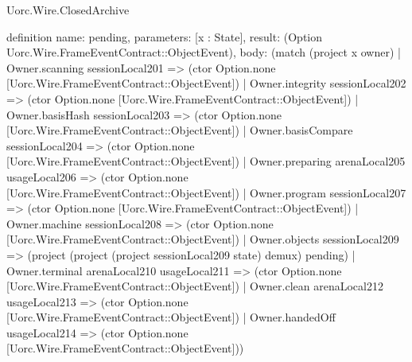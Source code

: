 \begin{lexlean}{Uorc.Wire.ClosedArchive}
\begin{semanticmodule}
definition{
  name: pending,
  parameters: [x : State],
  result: (Option Uorc.Wire.FrameEventContract::ObjectEvent),
  body: (match (project x owner)
    | Owner.scanning sessionLocal201 => (ctor Option.none [Uorc.Wire.FrameEventContract::ObjectEvent])
    | Owner.integrity sessionLocal202 => (ctor Option.none [Uorc.Wire.FrameEventContract::ObjectEvent])
    | Owner.basisHash sessionLocal203 => (ctor Option.none [Uorc.Wire.FrameEventContract::ObjectEvent])
    | Owner.basisCompare sessionLocal204 => (ctor Option.none [Uorc.Wire.FrameEventContract::ObjectEvent])
    | Owner.preparing arenaLocal205 usageLocal206 => (ctor Option.none [Uorc.Wire.FrameEventContract::ObjectEvent])
    | Owner.program sessionLocal207 => (ctor Option.none [Uorc.Wire.FrameEventContract::ObjectEvent])
    | Owner.machine sessionLocal208 => (ctor Option.none [Uorc.Wire.FrameEventContract::ObjectEvent])
    | Owner.objects sessionLocal209 => (project (project (project sessionLocal209 state) demux) pending)
    | Owner.terminal arenaLocal210 usageLocal211 => (ctor Option.none [Uorc.Wire.FrameEventContract::ObjectEvent])
    | Owner.clean arenaLocal212 usageLocal213 => (ctor Option.none [Uorc.Wire.FrameEventContract::ObjectEvent])
    | Owner.handedOff usageLocal214 => (ctor Option.none [Uorc.Wire.FrameEventContract::ObjectEvent]))
}


\end{semanticmodule}
\end{lexlean}
